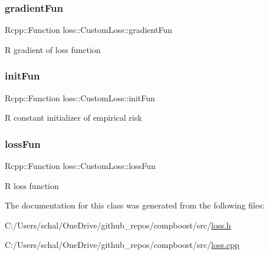 \subsubsection{\texorpdfstring{gradient\+Fun}{gradientFun}}
{\footnotesize\ttfamily Rcpp\+::\+Function loss\+::\+Custom\+Loss\+::gradient\+Fun\hspace{0.3cm}{\ttfamily [private]}}



{\ttfamily R} gradient of loss function 

\mbox{\label{classloss_1_1_custom_loss_a0c7a32f9ab123e8bc45154103f295055}} 
\subsubsection{\texorpdfstring{init\+Fun}{initFun}}
{\footnotesize\ttfamily Rcpp\+::\+Function loss\+::\+Custom\+Loss\+::init\+Fun\hspace{0.3cm}{\ttfamily [private]}}



{\ttfamily R} constant initializer of empirical risk 

\mbox{\label{classloss_1_1_custom_loss_a90aa6d3240cd14bc3ede21af38b70c8a}} 
\subsubsection{\texorpdfstring{loss\+Fun}{lossFun}}
{\footnotesize\ttfamily Rcpp\+::\+Function loss\+::\+Custom\+Loss\+::loss\+Fun\hspace{0.3cm}{\ttfamily [private]}}



{\ttfamily R} loss function 



The documentation for this class was generated from the following files\+:\begin{DoxyCompactItemize}
\item 
C\+:/\+Users/schal/\+One\+Drive/github\+\_\+repos/compboost/src/\mbox{\hyperlink{loss_8h}{loss.\+h}}\item 
C\+:/\+Users/schal/\+One\+Drive/github\+\_\+repos/compboost/src/\mbox{\hyperlink{loss_8cpp}{loss.\+cpp}}\end{DoxyCompactItemize}
